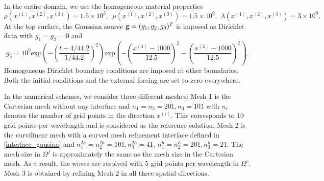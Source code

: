 In the entire domain, we use the homogeneous material properties
\begin{equation*}
\rho(x^{(1)},x^{(2)},x^{(3)}) = 1.5\times 10^3,\ \  \mu(x^{(1)},x^{(2)},x^{(3)}) = 1.5\times 10^9,\ \ 
\lambda(x^{(1)},x^{(2)},x^{(3)})  = 3\times 10^9.
\end{equation*}
At the top surface, the Gaussian source 
${\bf g} = (g_1,g_2,g_3)^T$ is imposed as Dirichlet data with $g_1 = g_2 = 0$ and 
\[g_3 = 10^9 \text{exp}\left(-\left(\frac{t-4/44.2}{1/44.2}\right)^2\right)\text{exp}\left(-\left(\frac{x^{(1)}-1000}{12.5}\right)^2-\left(\frac{x^{(2)}-1000}{12.5}\right)^2\right).\]  
Homogeneous Dirichlet boundary conditions are imposed at other boundaries. Both the initial conditions and the external forcing are set to zero everywhere.%

In the numerical schemes, we consider three different meshes: Mesh 1 is the Cartesian mesh without any interface and $n_1 = n_2 = 201, n_3 = 101$ with $n_i$ denotes the number of grid points in the direction $x^{(i)}$. This corresponds to 10 grid points per wavelength and is considered as the  reference solution. Mesh 2 is the curvilinear mesh with a curved mesh refinement interface defined in \eqref{interface_gausian} and $n_1^{2h} = n_2^{2h} = 101, n_3^{2h} = 41$, $n_1^h = n_2^h = 201, n_3^h = 21$. The mesh size in $\Omega^f$ is approximately the same as the mesh size in the Cartesian mesh. As a result, the waves are resolved with 5 grid points per wavelength in $\Omega^c$. Mesh 3 is obtained by refining Mesh 2 in all three spatial directions. %

